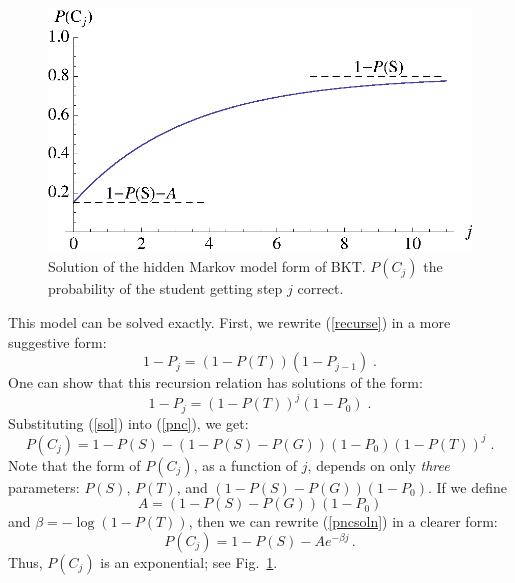 \documentclass{acmlarge-edm}
\begin{document}
\begin{figure}
\centering\includegraphics{exponential.eps}
\caption{Solution of the hidden Markov model form of BKT. 
          $P(C_j)$ the probability of  the student getting step $j$ correct.}
 \label{bktgraph}
\end{figure}

This model can be  solved exactly.  First, we rewrite (\ref{recurse}) in a
more suggestive form:
%
\begin{equation}
        1-P_j = \left(1-P(T)\right) \left(1-P_{j-1}\right) \; .
\end{equation}
%
One can show that this recursion relation has solutions of the form:
%
\begin{equation}
            1-P_j = \left(1-P(T)\right)^j\left(1-P_0\right) \; .
	    \label{sol}
\end{equation}
%
%
Substituting (\ref{sol}) into (\ref{pnc}), we get:
%
\begin{equation}
         P(C_j) = 1-P(S) -\left(1-P(S)-P(G)\right) \left(1-P_0\right)
                   \left(1-P(T)\right)^j \; . \label{pncsoln}
\end{equation}
%
Note that the form of $P(C_j)$, as a function of $j$, 
depends on only {\em three} parameters:  $P(S)$, $P(T)$, and 
$\left(1-P(S)-P(G)\right) \left(1-P_0\right)$.
If we define
%
\begin{equation} 
          A=\left(1-P(S)-P(G)\right) \left(1-P_0\right)  \label{aa}
\end{equation}
%
 and $\beta=-\log(1-P(T))$, then we can rewrite (\ref{pncsoln}) in 
a clearer form:
%
\begin{equation}
         P(C_j) = 1-P(S) -A e^{-\beta j} \, .
\end{equation}
%
Thus, $P(C_j)$ is an exponential; see Fig.~\ref{bktgraph}.
\end{document}
